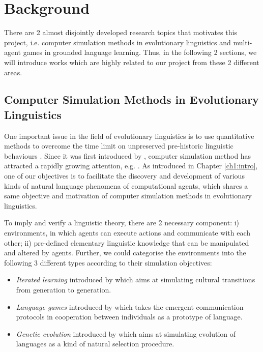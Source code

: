 \chapter{Background}
\label{ch2:background}

There are 2 almost disjointly developed research topics that motivates this project, i.e. computer simulation methods in evolutionary linguistics and multi-agent games in grounded language learning. Thus, in the following 2 sections, we will introduce works which are highly related to our project from these 2 different areas.

\section{Computer Simulation Methods in Evolutionary Linguistics}
\label{sec2.1:evolang}

One important issue in the field of evolutionary linguistics is to use quantitative methods to overcome the time limit on unpreserved pre-historic linguistic behaviours \cite{lieberman2006toward, evans2009myth}. Since it was first introduced by \cite{hurford1989biological}, computer simulation method has attracted a rapidly growing attention, e.g. \cite{hurford1998approaches, knight2000evolutionary, briscoe2002book, christiansen2003language, bickerton2009biological, cangelosi2012simulating}. As introduced in Chapter \ref{ch1:intro}, one of our objectives is to facilitate the discovery and development of various kinds of natural language phenomena of computational agents, which shares a same objective and motivation of computer simulation methods in evolutionary linguistics.

To imply and verify a linguistic theory, there are 2 necessary component: i) environments, in which agents can execute actions and communicate with each other; ii) pre-defined elementary linguistic knowledge that can be manipulated and altered by agents. Further, we could categorise the environments into the following 3 different types according to their simulation objectives:
\begin{itemize}
  \item \textit{Iterated learning} introduced by \cite{kirby1999function} which aims at simulating cultural transitions from generation to generation.
  \item \textit{Language games} introduced by \cite{wittgenstein2009philosophical} which takes the emergent communication protocols in cooperation between individuals as a prototype of language.
  \item \textit{Genetic evolution} introduced by \cite{briscoe1998language} which aims at simulating evolution of languages as a kind of natural selection procedure\cite{darwin1859origin}.
\end{itemize}

